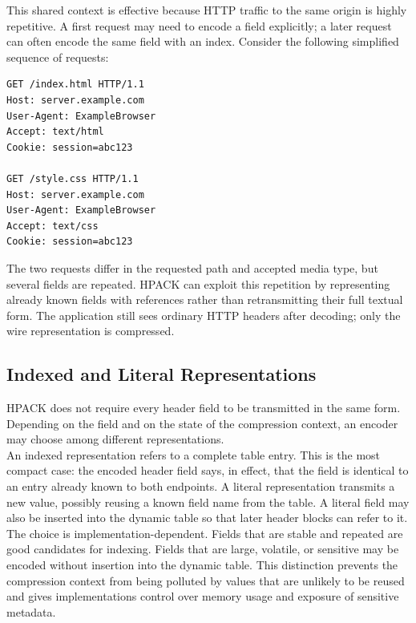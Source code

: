 \documentclass{scrbook}
\begin{document}
This shared context is effective because HTTP traffic to the same origin is highly repetitive. A first request may need to encode a field explicitly; a later request can often encode the same field with an index. Consider the following simplified sequence of requests:

\begin{lstlisting}
GET /index.html HTTP/1.1
Host: server.example.com
User-Agent: ExampleBrowser
Accept: text/html
Cookie: session=abc123

GET /style.css HTTP/1.1
Host: server.example.com
User-Agent: ExampleBrowser
Accept: text/css
Cookie: session=abc123
\end{lstlisting}

The two requests differ in the requested path and accepted media type, but several fields are repeated. HPACK can exploit this repetition by representing already known fields with references rather than retransmitting their full textual form. The application still sees ordinary HTTP headers after decoding; only the wire representation is compressed.

\subsection{Indexed and Literal Representations}

HPACK does not require every header field to be transmitted in the same form. Depending on the field and on the state of the compression context, an encoder may choose among different representations.\\

An indexed representation refers to a complete table entry. This is the most compact case: the encoded header field says, in effect, that the field is identical to an entry already known to both endpoints. A literal representation transmits a new value, possibly reusing a known field name from the table. A literal field may also be inserted into the dynamic table so that later header blocks can refer to it.\\

The choice is implementation-dependent. Fields that are stable and repeated are good candidates for indexing. Fields that are large, volatile, or sensitive may be encoded without insertion into the dynamic table. This distinction prevents the compression context from being polluted by values that are unlikely to be reused and gives implementations control over memory usage and exposure of sensitive metadata.
\end{document}
